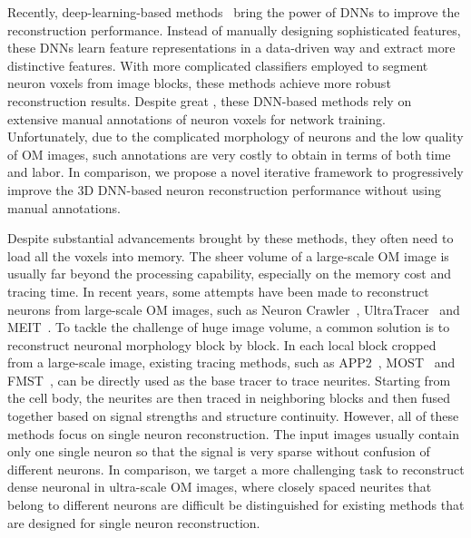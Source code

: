 Recently, deep-learning-based methods~\cite{Li2017, Zhou2018, Xu2016,Kozinski-MIA2020} bring the power of DNNs to improve the reconstruction performance. 
Instead of manually designing sophisticated features, these DNNs learn feature representations in a data-driven way and extract more distinctive features. 
With more complicated classifiers employed to segment neuron voxels from image blocks, these methods achieve more robust reconstruction results. 
Despite great , these DNN-based methods rely on extensive manual annotations of neuron voxels for network training.
Unfortunately, due to the complicated morphology of neurons and the low quality of OM images, such annotations are very costly to obtain in terms of both time and labor.
%
In comparison, we propose a novel iterative framework to progressively improve the 3D DNN-based neuron reconstruction performance without using manual annotations.



Despite substantial advancements brought by these methods, they often need to load all the voxels into memory.
The sheer volume of a large-scale OM image is usually far beyond the processing capability, especially on the memory cost and tracing time.
%
In recent years, some attempts have been made to reconstruct neurons from large-scale OM images, such as Neuron Crawler~\cite{Zhou2015}, UltraTracer~\cite{Peng2017} and MEIT~\cite{Wang2018}.
To tackle the challenge of huge image volume, a common solution is to reconstruct neuronal morphology block by block. 
In each local block cropped from a large-scale image, existing tracing methods, such as APP2~\cite{Xiao2013}, MOST~\cite{Wu2014} and FMST~\cite{Yang2019}, can be directly used as the base tracer to trace neurites. 
Starting from the cell body, the neurites are then traced in neighboring blocks and then fused together based on signal strengths and structure continuity.
%
However, all of these methods focus on single neuron reconstruction.
The input images usually contain only one single neuron so that the signal is very sparse without confusion of different neurons. 
%
In comparison, we target a more challenging task to reconstruct dense neuronal  in ultra-scale OM images, where closely spaced neurites that belong to different neurons are difficult be distinguished for existing methods that are designed for single neuron reconstruction.


